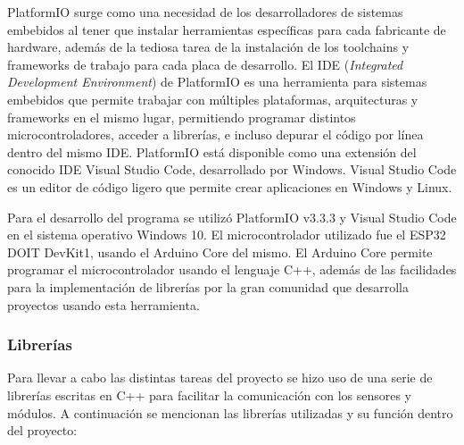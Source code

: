 PlatformIO surge como una necesidad de los desarrolladores de sistemas embebidos al tener que instalar herramientas específicas para cada fabricante de hardware, además de la tediosa tarea de la instalación de los toolchains y frameworks de trabajo para cada placa de desarrollo. El IDE (\textit{Integrated Development Environment}) de PlatformIO es una herramienta para sistemas embebidos que permite trabajar con múltiples plataformas, arquitecturas y frameworks en el mismo lugar, permitiendo programar distintos microcontroladores, acceder a librerías, e incluso depurar el código por línea dentro del mismo IDE. PlatformIO está disponible como una extensión del conocido IDE Visual Studio Code, desarrollado por Windows. Visual Studio Code es un editor de código ligero que permite crear aplicaciones en Windows y Linux.

Para el desarrollo del programa se utilizó PlatformIO v3.3.3 y Visual Studio Code en el sistema operativo Windows 10. El microcontrolador utilizado fue el ESP32 DOIT DevKit1, usando el Arduino Core del mismo. El Arduino Core permite programar el microcontrolador usando el lenguaje C++, además de las facilidades para la implementación de librerías por la gran comunidad que desarrolla proyectos usando esta herramienta.

\subsubsection{Librerías} 

Para llevar a cabo las distintas tareas del proyecto se hizo uso de una serie de librerías escritas en C++ para facilitar la comunicación con los sensores y módulos. A continuación se mencionan las librerías utilizadas y su función dentro del proyecto:

